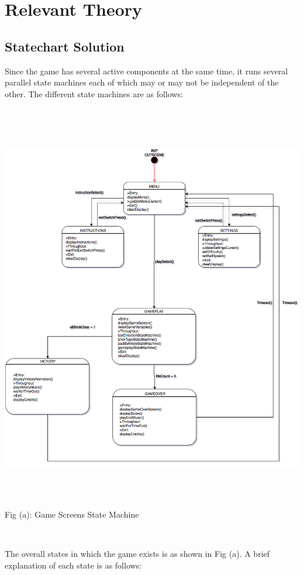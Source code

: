 \documentclass{article}
\begin{document}
\section{Relevant Theory}
\subsection{Statechart Solution}
\qquad Since the game has several active components at the same time, it runs several parallel state machines each of which may or may not be independent of the other. The different state machines are as follows:
\begin{center}
\includegraphics[width=14cm, height=18cm]{Images/gameStateMachine} \\
\caption{Fig (a): Game Screens State Machine} \\
\end{center}
\newpage
\qquad The overall states in which the game exists is as shown in Fig (a). A brief explanation of each state is as follows:
\end{document}
